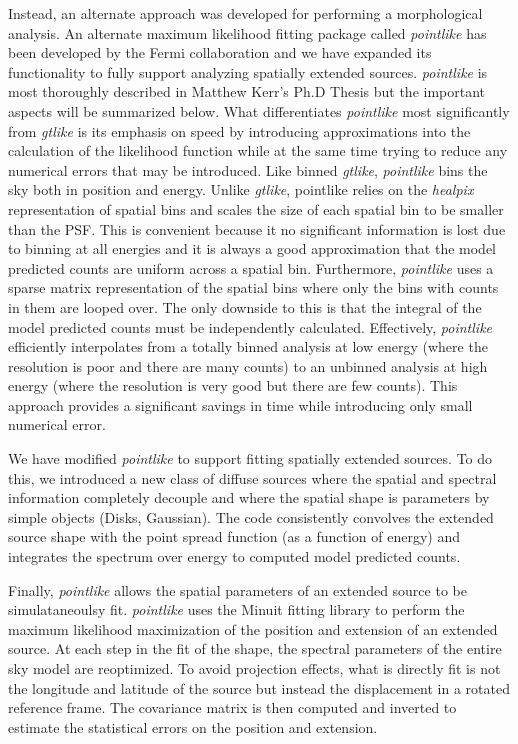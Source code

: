 \documentclass[12pt]{article}
\begin{document}
Instead, an alternate approach was developed for performing
a morphological analysis. An alternate maximum likelihood fitting
package called {\em pointlike} has been developed by the Fermi
collaboration and we have expanded its functionality to fully support
analyzing spatially extended sources. {\em pointlike} is most thoroughly
described in Matthew Kerr's Ph.D Thesis\cite{Matthew_kerr_phd_thesis}
but the important aspects will be summarized below. What differentiates
{\em pointlike} most significantly from {\em gtlike} is its emphasis
on speed by introducing approximations into the calculation of the
likelihood function while at the same time trying to reduce any
numerical errors that may be introduced.  Like binned {\em gtlike},
{\em pointlike} bins the sky both in position and energy.  Unlike {\em
gtlike}, pointlike relies on the {\em healpix} representation of spatial
bins\cite{healpix_paper} and scales the size of each spatial bin to be
smaller than the PSF. This is convenient because it no
significant information is lost due to binning at all energies and it is
always a good approximation that the model predicted counts are uniform
across a spatial bin. Furthermore, {\em pointlike} uses a sparse matrix
representation of the spatial bins where only the bins with counts in them
are looped over. The only downside to this is that the integral of the
model predicted counts must be independently calculated.  Effectively,
{\em pointlike} efficiently interpolates from a totally binned analysis
at low energy (where the resolution is poor and there are many counts)
to an unbinned analysis at high energy (where the resolution is very
good but there are few counts). This approach provides a significant
savings in time while introducing only small numerical error.

We have modified {\em pointlike} to support fitting spatially extended
sources.  To do this, we introduced a new class of diffuse sources where
the spatial and spectral information completely decouple and where
the spatial shape is parameters by simple objects (Disks, Gaussian).
The code consistently convolves the extended source shape with the point
spread function (as a function of energy) and integrates the spectrum over energy
to computed model predicted counts.

Finally, {\em pointlike} allows the spatial parameters of an extended
source to be simulataneoulsy fit. {\em pointlike} uses the Minuit fitting
library to perform the maximum likelihood maximization of the position
and extension of an extended source\cite{Minuit reference}.  At each
step in the fit of the shape, the spectral parameters of the entire sky
model are reoptimized. To avoid projection effects, what is directly
fit is not the longitude and latitude of the source but instead
the displacement in a rotated reference frame. The covariance matrix is
then computed and inverted to estimate the statistical errors on the
position and extension.
\end{document}
